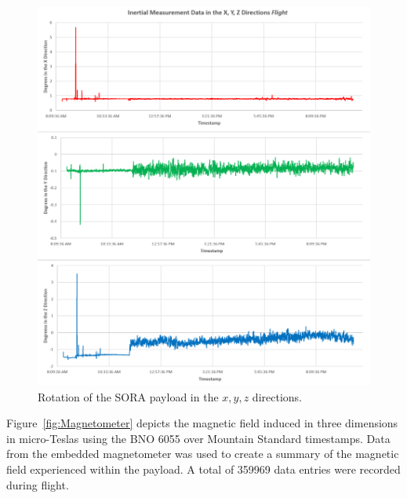 \begin{figure}[H]
\centering
\includegraphics[width=\textwidth]{./Figures/theta-xyz.png}
\caption{Rotation of the SORA payload in the $x, y, z$ directions.}
\label{fig:BNO} 
\end{figure}
\clearpage

Figure~\ref{fig:Magnetometer} depicts the magnetic field induced in three dimensions in micro-Teslas using the BNO 6055 over Mountain Standard timestamps.  Data from the embedded magnetometer was used to create a summary of the magnetic field experienced within the payload.  A total of \num{359969} data entries were recorded during flight. 

